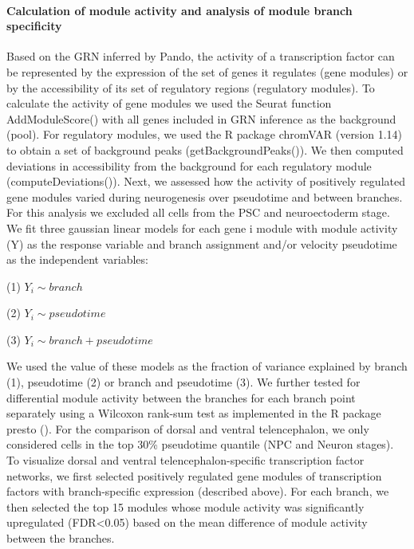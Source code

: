 \paragraph{Calculation of module activity and analysis of module branch specificity}
Based on the GRN inferred by Pando, the activity of a transcription factor can be represented by the expression of the set of genes it regulates (gene modules) or by the accessibility of its set of regulatory regions (regulatory modules). To calculate the activity of gene modules we used the Seurat function AddModuleScore() with all genes included in GRN inference as the background (pool). For regulatory modules, we used the R package chromVAR (version 1.14) to obtain a set of background peaks (getBackgroundPeaks()). We then computed deviations in accessibility from the background for each regulatory module (computeDeviations()). Next, we assessed how the activity of positively regulated gene modules varied during neurogenesis over pseudotime and between branches. For this analysis we excluded all cells from the PSC and neuroectoderm stage. We fit three gaussian linear models for each gene i module with module activity (Y) as the response variable and branch assignment and/or velocity pseudotime as the independent variables:

\hspace{0.5cm}

(1) $ Y_i \sim branch $ 

(2) $ Y_i \sim pseudotime $ 

(3) $ Y_i \sim branch + pseudotime $ 
 
\hspace{0.5cm}

We used the  value of these models as the fraction of variance explained by branch (1), pseudotime (2) or branch and pseudotime (3). We further tested for differential module activity between the branches for each branch point separately using a Wilcoxon rank-sum test as implemented in the R package presto (\cite{korsunsky_presto_2019}). For the comparison of dorsal and ventral telencephalon, we only considered cells in the top 30\% pseudotime quantile (NPC and Neuron stages).  To visualize dorsal and ventral telencephalon-specific transcription factor networks, we first selected positively regulated gene modules of transcription factors with branch-specific expression (described above). For each branch, we then selected the top 15 modules whose module activity was significantly upregulated (FDR<0.05) based on the mean difference of module activity between the branches.
                       
